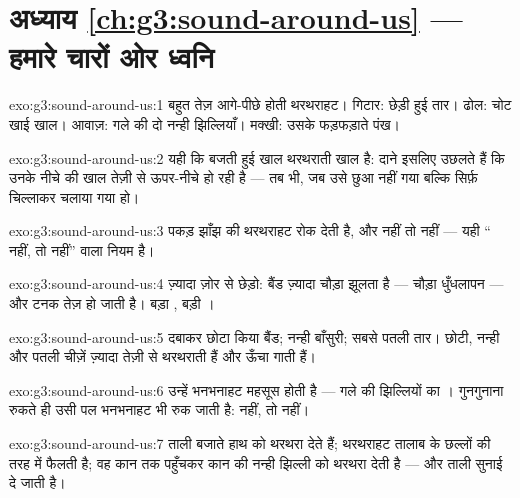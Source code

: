 \section*{अध्याय \ref{ch:g3:sound-around-us} --- हमारे चारों ओर ध्वनि}

\begin{solution}{exo:g3:sound-around-us:1}
बहुत तेज़ आगे-पीछे होती थरथराहट। गिटार: छेड़ी हुई तार। ढोल: चोट खाई
खाल। आवाज़: गले की दो नन्ही झिल्लियाँ। मक्खी: उसके फड़फड़ाते पंख।
\end{solution}

\begin{solution}{exo:g3:sound-around-us:2}
यही कि बजती हुई खाल थरथराती खाल है: दाने इसलिए उछलते हैं कि उनके नीचे
की खाल तेज़ी से ऊपर-नीचे हो रही है --- तब भी, जब उसे छुआ नहीं गया
बल्कि सिर्फ़ चिल्लाकर चलाया गया हो।
\end{solution}

\begin{solution}{exo:g3:sound-around-us:3}
पकड़ झाँझ की थरथराहट रोक देती है, और  नहीं तो  नहीं ---
यही `` नहीं, तो  नहीं'' वाला नियम है।
\end{solution}

\begin{solution}{exo:g3:sound-around-us:4}
ज़्यादा ज़ोर से छेड़ो: बैंड ज़्यादा चौड़ा झूलता है --- चौड़ा
धुँधलापन --- और टनक तेज़ हो जाती है। बड़ा , बड़ी ।
\end{solution}

\begin{solution}{exo:g3:sound-around-us:5}
दबाकर छोटा किया बैंड; नन्ही बाँसुरी; सबसे पतली तार। छोटी, नन्ही और
पतली चीज़ें ज़्यादा तेज़ी से थरथराती हैं और ऊँचा गाती हैं।
\end{solution}

\begin{solution}{exo:g3:sound-around-us:6}
उन्हें भनभनाहट महसूस होती है --- गले की झिल्लियों का । गुनगुनाना
रुकते ही उसी पल भनभनाहट भी रुक जाती है:  नहीं, तो  नहीं।
\end{solution}

\begin{solution}{exo:g3:sound-around-us:7}
ताली बजाते हाथ  को थरथरा देते हैं; थरथराहट तालाब के छल्लों की तरह
 में फैलती है; वह कान तक पहुँचकर कान की नन्ही झिल्ली को थरथरा
देती है --- और ताली सुनाई दे जाती है।
\end{solution}

